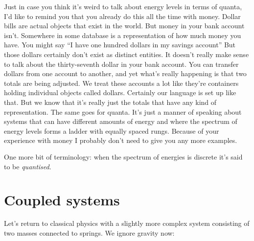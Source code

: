 \documentclass[a4paper]{article}
\begin{document}
Just in case you think it's weird to talk about energy levels in terms of quanta, I'd like to remind you that you already do this all the time with money.
Dollar bills are actual objects that exist in the world.
But money in your bank account isn't.
Somewhere in some database is a representation of how much money you have.
You might say ``I have one hundred dollars in my savings account''
But those dollars certainly don't exist as distinct entities.
It doesn't really make sense to talk about the thirty-seventh dollar in your bank account.
You can transfer dollars from one account to another, and yet what's really happening is that two totals are being adjusted.
We treat these accounts a lot like they're containers holding individual objects called dollars.
Certainly our language is set up like that.
But we know that it's really just the totals that have any kind of representation.
The same goes for quanta.
It's just a manner of speaking about systems that can have different amounts of energy and where the spectrum of energy levels forms a ladder with equally spaced rungs.
Because of your experience with money I probably don't need to give you any more examples.

One more bit of terminology: when the spectrum of energies is discrete it's said to be {\em quantised}.

\section{Coupled systems}

Let's return to classical physics with a slightly more complex system consisting of two masses connected to springs. We ignore gravity now:

\begin{center}
\end{center}
\end{document}
